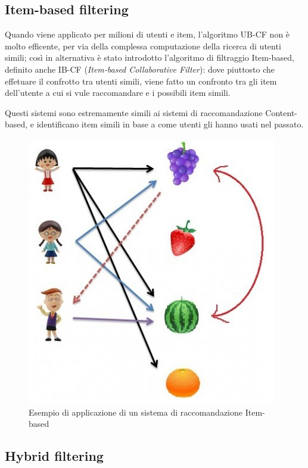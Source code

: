 \subsection{Item-based filtering} 


Quando viene applicato per milioni di utenti e item, l'algoritmo UB-CF non è molto efficente, per via della complessa computazione della 
ricerca di utenti simili; così in alternativa è stato introdotto l'algoritmo di filtraggio Item-based, definito anche IB-CF 
(\textit{Item-based Collaborative Filter}): dove piuttosto che effetuare il confrotto tra utenti simili, viene fatto un confronto tra 
gli item dell'utente a cui si vule raccomandare e i possibili item simili.

Questi sistemi sono estremamente simili ai sistemi di raccomandazione Content-based, e identificano item simili in base a come utenti gli
hanno usati nel passato.


\cite{item-based-collaborative-filtering}

\begin{figure}[ht!]
	\centering
	\includegraphics[scale=0.5]{images/IB_CF_ex.PNG}
	\caption{Esempio di applicazione di un sistema di raccomandazione Item-based}
	\label{fig:IB_CF}
\end{figure}


\subsection{Hybrid filtering} 
